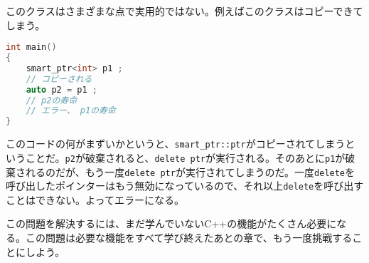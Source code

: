 このクラスはさまざまな点で実用的ではない。例えばこのクラスはコピーできてしまう。

\begin{lstlisting}[language={C++}]
int main()
{
    smart_ptr<int> p1 ;
    // コピーされる
    auto p2 = p1 ;
    // p2の寿命
    // エラー、 p1の寿命
}
\end{lstlisting}

このコードの何がまずいかというと、\texttt{smart\_ptr::ptr}がコピーされてしまうということだ。\texttt{p2}が破棄されると、\texttt{delete ptr}が実行される。そのあとに\texttt{p1}が破棄されるのだが、もう一度\texttt{delete ptr}が実行されてしまうのだ。一度\texttt{delete}を呼び出したポインターはもう無効になっているので、それ以上\texttt{delete}を呼び出すことはできない。よってエラーになる。

この問題を解決するには、まだ学んでいないC++の機能がたくさん必要になる。この問題は必要な機能をすべて学び終えたあとの章で、もう一度挑戦することにしよう。
